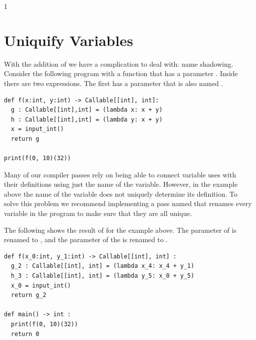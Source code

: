 \documentclass[7x10]{TimesAPriori_MIT}%
\def\racketEd{0}
\def\pythonEd{1}
\def\edition{1}
\newcommand{\racket}[1]{{\if\edition\racketEd{#1}\fi}}
\newcommand{\pythonColor}[0]{}
\newcommand{\python}[1]{{\if\edition\pythonEd\pythonColor #1\fi}}
\numberwithin{theorem}{chapter}
\numberwithin{definition}{chapter}
\numberwithin{equation}{chapter}
\begin{document}
{\if\edition\pythonEd\pythonColor
\section{Uniquify Variables}
\label{sec:uniquify-lambda}

With the addition of  we have a complication to deal
with: name shadowing. Consider the following program with a function
 that has a parameter . Inside  there are two
 expressions. The first  has a parameter
that is also named .

\begin{lstlisting}
def f(x:int, y:int) -> Callable[[int], int]:
  g : Callable[[int],int] = (lambda x: x + y)
  h : Callable[[int],int] = (lambda y: x + y)
  x = input_int()
  return g

print(f(0, 10)(32))
\end{lstlisting}

Many of our compiler passes rely on being able to connect variable
uses with their definitions using just the name of the
variable. However, in the example above the name of the variable does
not uniquely determine its definition. To solve this problem we
recommend implementing a pass named  that renames every
variable in the program to make sure that they are all unique.

The following shows the result of  for the example
above. The  parameter of  is renamed to ,
and the  parameter of the  is renamed to
.

\begin{lstlisting}
def f(x_0:int, y_1:int) -> Callable[[int], int] :
  g_2 : Callable[[int], int] = (lambda x_4: x_4 + y_1)
  h_3 : Callable[[int], int] = (lambda y_5: x_0 + y_5)
  x_0 = input_int()
  return g_2

def main() -> int :
  print(f(0, 10)(32))
  return 0
\end{lstlisting}

\fi} %


\end{document}
